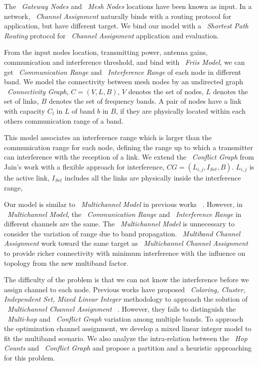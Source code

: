 The ~\emph{Gateway Nodes} and ~\emph{Mesh Nodes} locations have been known as input. In a network, ~\emph{Channel Assignment} naturally binds with a routing protocol for application, but have different target. We bind our model with a ~\emph{Shortest Path Routing} protocol for ~\emph{Channel Assignment} application and evaluation.

From the input nodes location, transmitting power, antenna gains, communication and interference threshold, and bind with ~\emph{Friis Model}, we can get ~\emph{Communication Range} and ~\emph{Interference Range} of each node in different band. 
We model the connectivity between mesh nodes by an undirected graph ~\emph{Connectivity Graph}, $C=(V,L,B)$, $V$ denotes the set of nodes, $L$ denotes the set of links, $B$ denotes the set of frequency bands. A pair of nodes have a link with capacity $C_l$ in $L$ of band $b$ in $B$, if they are physically located within each others communication range of a band. 

This model associates an interference range which is larger than the communication range for each node, defining the range up to which a transmitter can interference with the reception of a link. We extend the ~\emph{Conflict Graph} from Jain's work with a flexible approach for interference, $CG=(L_{i,j},I_{Set},B)$. $L_{i,j}$ is the active link, $I_{Set}$ includes all the links are physically inside the interference range, 

Our model is similar to ~\emph{Multichannel Model} in previous works ~\cite{tang2005interference,yuan2006cross,si2010overview}. However, in ~\emph{Multichannel Model}, the ~\emph{Communication Range} and ~\emph{Interference Range} in different channels are the same. The ~\emph{Multichannel Model} is unnecessary to consider the variation of range due to band propagation.
~\emph{Multiband Channel Assignment} work toward the same target as ~\emph{Multichannel Channel Assignment} to provide richer connectivity with minimum interference with the influence on topology from the new multiband factor.

The difficulty of the problem is that we can not know the interference before we assign channel to each node. Previous works have proposed ~\emph{Coloring, Cluster, Independent Set, Mixed Linear Integer} methodology to approach the solution of ~\emph{Multichannel Channel Assignment} ~\cite{mishra2005weighted,peng2012efficient,tang2005interference}. 
However, they fails to distinguish the ~\emph{Multi-hop} and ~\emph{Conflict Graph} variation among multiple bands.
To approach the optimization channel assignment, we develop a mixed linear integer model to fit the multiband scenario. We also analyze the intra-relation between the ~\emph{Hop Counts} and ~\emph{Conflict Graph} and propose a partition and a heuristic approaching for this problem.

